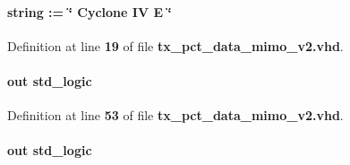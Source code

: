 \paragraph[{dev\+\_\+family}]{ {\bfseries \textcolor{vhdlchar}{ }} {\bfseries \textcolor{comment}{string}\textcolor{vhdlchar}{ }\textcolor{vhdlchar}{ }\textcolor{vhdlchar}{\+:}\textcolor{vhdlchar}{=}\textcolor{vhdlchar}{ }\textcolor{vhdlchar}{ }\textcolor{vhdlchar}{ }\textcolor{vhdlchar}{ }\textcolor{keyword}{\char`\"{} Cyclone I\+V E \char`\"{}}\textcolor{vhdlchar}{ }} \hspace{0.3cm}{\ttfamily [Generic]}}\label{classtx__pct__data__mimo__v2_a1314572919959082d23e5f98e64a0ce2}


Definition at line {\bf 19} of file {\bf tx\+\_\+pct\+\_\+data\+\_\+mimo\+\_\+v2.\+vhd}.

\paragraph[{error\+\_\+out}]{ {\bfseries \textcolor{keywordflow}{out}\textcolor{vhdlchar}{ }} {\bfseries \textcolor{comment}{std\+\_\+logic}\textcolor{vhdlchar}{ }} \hspace{0.3cm}{\ttfamily [Port]}}\label{classtx__pct__data__mimo__v2_a7d3323a10c64f9e722f7b8e5e5a7ad6a}


Definition at line {\bf 53} of file {\bf tx\+\_\+pct\+\_\+data\+\_\+mimo\+\_\+v2.\+vhd}.

\paragraph[{error\+\_\+out\+\_\+fx3}]{ {\bfseries \textcolor{keywordflow}{out}\textcolor{vhdlchar}{ }} {\bfseries \textcolor{comment}{std\+\_\+logic}\textcolor{vhdlchar}{ }} \hspace{0.3cm}{\ttfamily [Port]}}\label{classtx__pct__data__mimo__v2_ac7dca2cb975cdeda5358624530b2f52f}


